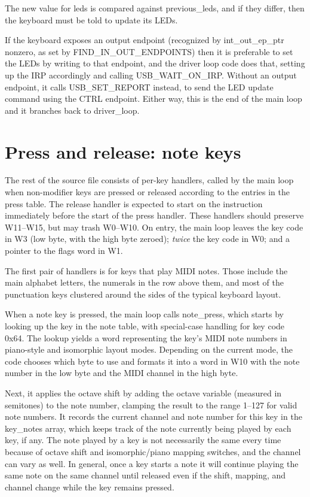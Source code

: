 The new value for leds is compared against previous\_leds, and if they
differ, then the keyboard must be told to update its LEDs.

If the keyboard exposes an output endpoint (recognized by int\_out\_ep\_ptr
nonzero, as set by FIND\_IN\_OUT\_ENDPOINTS) then it is preferable to set
the LEDs by writing to that endpoint, and the driver loop code does that,
setting up the IRP accordingly and calling USB\_WAIT\_ON\_IRP.  Without an
output endpoint, it calls USB\_SET\_REPORT instead, to send the LED update
command using the CTRL endpoint.  Either way, this is the end of the main
loop and it branches back to driver\_loop.

\section{Press and release:  note keys}

The rest of the source file consists of per-key handlers,
called by the main loop when non-modifier keys are pressed or released
according to the entries in the press table.  The release handler is
expected to start on the instruction immediately before the start of the
press handler.  These handlers should preserve W11--W15, but may trash
W0--W10.  On entry, the main loop leaves the key code in W3 (low byte, with
the high byte zeroed); \emph{twice} the key code in W0; and a pointer to the
flags word in W1.

The first pair of handlers is for keys that play MIDI notes.  Those include
the main alphabet letters, the numerals in the row above them, and most of
the punctuation keys clustered around the sides of the typical keyboard
layout.

When a note key is pressed, the main loop calls note\_press, which starts by
looking up the key in the note table, with special-case handling for key
code 0x64.  The lookup yields a word representing the key's MIDI note
numbers in piano-style and isomorphic layout modes.  Depending on the
current mode, the code chooses which byte to use and formats it into a word
in W10 with the note number in the low byte and the MIDI channel in the high
byte.

Next, it applies the octave shift by adding the octave variable (measured in
semitones) to the note number, clamping the result to the range 1--127 for
valid note numbers.  It records the current channel and note number for this
key in the key\_notes array, which keeps track of the note currently being
played by each key, if any.  The note played by a key is not necessarily the
same every time because of octave shift and isomorphic/piano mapping
switches, and the channel can vary as well.  In general, once a key starts a
note it will continue playing the same note on the same channel until
released even if the shift, mapping, and channel change while the key
remains pressed.


